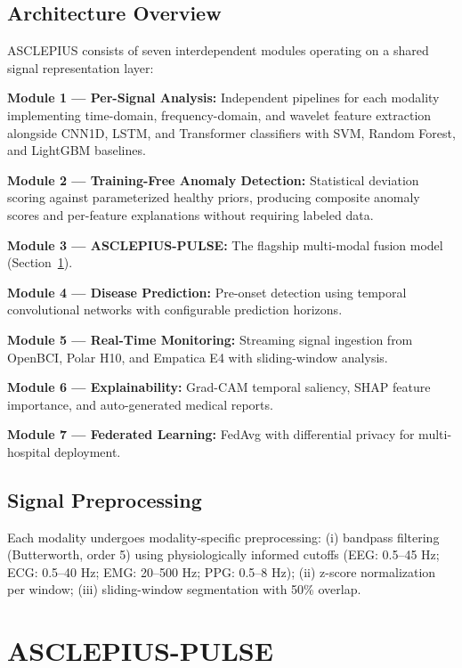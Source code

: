 \documentclass[journal]{IEEEtran}
\begin{document}
\subsection{Architecture Overview}

ASCLEPIUS consists of seven interdependent modules operating on a shared
signal representation layer:

\textbf{Module 1 — Per-Signal Analysis:} Independent pipelines for each
modality implementing time-domain, frequency-domain, and wavelet feature
extraction alongside CNN1D, LSTM, and Transformer classifiers with SVM,
Random Forest, and LightGBM baselines.

\textbf{Module 2 — Training-Free Anomaly Detection:} Statistical deviation
scoring against parameterized healthy priors, producing composite anomaly
scores and per-feature explanations without requiring labeled data.

\textbf{Module 3 — ASCLEPIUS-PULSE:} The flagship multi-modal fusion model
(Section~\ref{sec:pulse}).

\textbf{Module 4 — Disease Prediction:} Pre-onset detection using temporal
convolutional networks with configurable prediction horizons.

\textbf{Module 5 — Real-Time Monitoring:} Streaming signal ingestion from
OpenBCI, Polar H10, and Empatica E4 with sliding-window analysis.

\textbf{Module 6 — Explainability:} Grad-CAM temporal saliency, SHAP feature
importance, and auto-generated medical reports.

\textbf{Module 7 — Federated Learning:} FedAvg with differential privacy
for multi-hospital deployment.

\subsection{Signal Preprocessing}

Each modality undergoes modality-specific preprocessing:
(i) bandpass filtering (Butterworth, order 5) using physiologically informed
cutoffs (EEG: 0.5–45 Hz; ECG: 0.5–40 Hz; EMG: 20–500 Hz; PPG: 0.5–8 Hz);
(ii) z-score normalization per window;
(iii) sliding-window segmentation with 50\% overlap.

\section{ASCLEPIUS-PULSE}
\label{sec:pulse}
\end{document}
